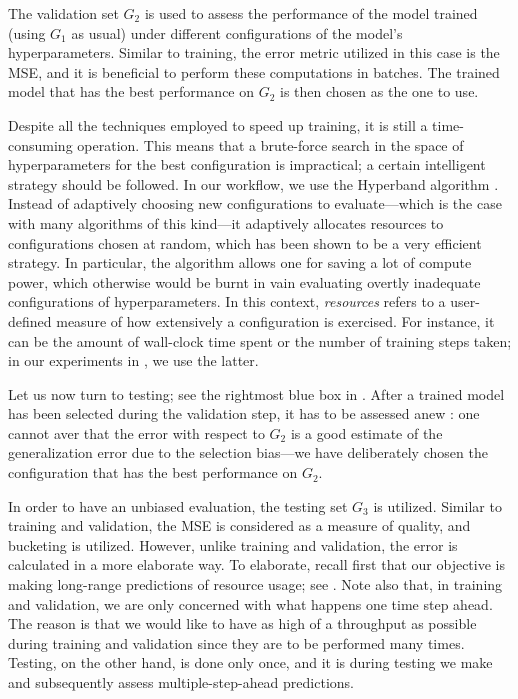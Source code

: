 The validation set $G_2$ is used to assess the performance of the model trained
(using $G_1$ as usual) under different configurations of the model's
hyperparameters. Similar to training, the error metric utilized in this case is
the \ac{MSE}, and it is beneficial to perform these computations in batches. The
trained model that has the best performance on $G_2$ is then chosen as the one
to use.

Despite all the techniques employed to speed up training, it is still a
time-consuming operation. This means that a brute-force search in the space of
hyperparameters for the best configuration is impractical; a certain intelligent
strategy should be followed. In our workflow, we use the Hyperband algorithm
\cite{li2016}. Instead of adaptively choosing new configurations to
evaluate---which is the case with many algorithms of this kind---it adaptively
allocates resources to configurations chosen at random, which has been shown to
be a very efficient strategy. In particular, the algorithm allows one for saving
a lot of compute power, which otherwise would be burnt in vain evaluating
overtly inadequate configurations of hyperparameters. In this context,
\emph{resources} refers to a user-defined measure of how extensively a
configuration is exercised. For instance, it can be the amount of wall-clock
time spent or the number of training steps taken; in our experiments in
, we use the latter.

Let us now turn to testing; see the rightmost blue box in .
After a trained model has been selected during the validation step, it has to be
assessed anew \cite{hastie2013}: one cannot aver that the error with respect to
$G_2$ is a good estimate of the generalization error due to the selection
bias---we have deliberately chosen the configuration that has the best
performance on $G_2$.

In order to have an unbiased evaluation, the testing set $G_3$ is utilized.
Similar to training and validation, the \ac{MSE} is considered as a measure of
quality, and bucketing is utilized. However, unlike training and validation, the
error is calculated in a more elaborate way. To elaborate, recall first that our
objective is making long-range predictions of resource usage; see
. Note also that, in training and validation, we are only
concerned with what happens one time step ahead. The reason is that we would
like to have as high of a throughput as possible during training and validation
since they are to be performed many times. Testing, on the other hand, is done
only once, and it is during testing we make and subsequently assess
multiple-step-ahead predictions.

